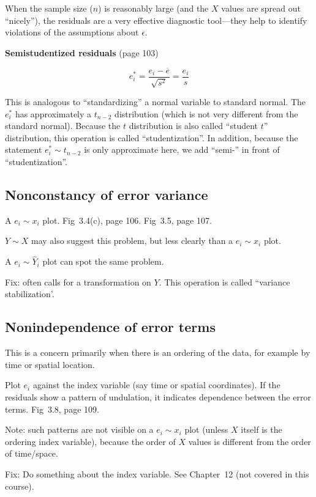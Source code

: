\documentclass[12pt]{article}
\begin{document}
When the sample size ($n$) is reasonably large (and the $X$ values are
spread out ``nicely''), the residuals are a very effective diagnostic
tool---they help to identify violations of the assumptions about
$\epsilon$.

\textbf{Semistudentized residuals} (page 103)

\[
e_i^* = \frac{e_i - \overline{e}}{\sqrt{s^2}} = \frac{e_i}{s}
\]

This is analogous to ``standardizing'' a normal variable to standard
normal. The $e_i^*$ has approximately a $t_{n-2}$ distribution
(which is not very different from the standard normal).
Because the $t$ distribution is also called ``student $t$''
distribution, this operation is called ``studentization''.
In addition, because the statement $e_i^* \sim t_{n-2}$ is only
approximate here, we add ``semi-'' in front of ``studentization''.



\subsection{Nonconstancy of error variance}

A $e_i \sim x_i$ plot. Fig~3.4(c), page 106. Fig~3.5, page 107.

$Y \sim X$ may also suggest this problem, but less clearly than
a $e_i \sim x_i$ plot.

A $e_i \sim \hat{Y}_i$ plot can spot the same problem.

Fix: often calls for a transformation on $Y$.
This operation is called ``variance stabilization'.


\subsection{Nonindependence of error terms}

This is a concern primarily when there is an ordering of the data, for
example by time or spatial location.

Plot $e_i$ against the index variable (say time or spatial coordinates).
If the residuals show a pattern of undulation,
it indicates dependence between the error terms.
Fig~3.8, page 109.

Note: such patterns are not visible on a $e_i \sim x_i$ plot
(unless $X$ itself is the ordering index variable),
because the order of $X$ values is different from the order of
time/space.

Fix: Do something about the index variable.
See Chapter~12 (not covered in this course).
\end{document}
